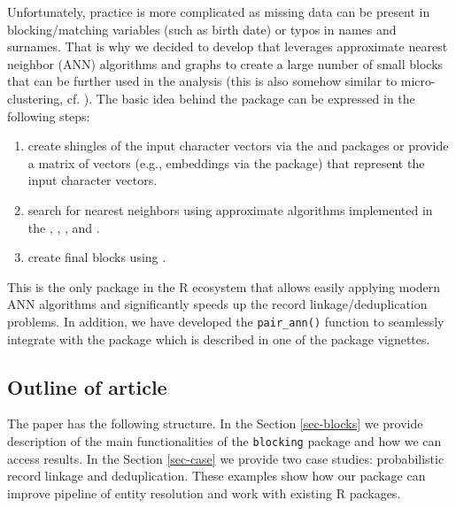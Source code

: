 Unfortunately, practice is more complicated as missing data can be
present in blocking/matching variables (such as birth date) or typos in
names and surnames. That is why we decided to develop 
that leverages approximate nearest neighbor (ANN) algorithms and graphs
to create a large number of small blocks that can be further used in the
analysis (this is also somehow similar to micro-clustering, cf.
\citet{johndrow2018theoretical}). The basic idea behind the 
package can be expressed in the following steps:

\begin{enumerate}
\def\labelenumi{\arabic{enumi}.}
\tightlist
\item
  create shingles of the input character vectors via the
   \citep{tokenizers} and 
  \citep{text2vec} packages or provide a matrix of vectors (e.g.,
  embeddings via the  \citep{ragnar} package) that
  represent the input character vectors.
\item
  search for nearest neighbors using approximate algorithms
  implemented in the  \citep{rnndescent},
   \citep{RcppHNSW},  \citep[
  \citet{mlpack2025}]{mlpack2023}, and  \citep{RcppAnnoy}.
\item
  create final blocks using  \citep[
  \citet{igraph2006}]{igraph2025}.
\end{enumerate}

This is the only package in the R ecosystem that allows easily applying
modern ANN algorithms and significantly speeds up the record
linkage/deduplication problems. In addition, we have developed the
\texttt{pair\_ann()} function to seamlessly integrate with the 
package which is described in one of the package vignettes.

\subsection{Outline of article}\label{outline-of-article}

The paper has the following structure. In the Section \ref{sec-blocks}
we provide description of the main functionalities of the \texttt{blocking}
package and how we can access results. In the Section \ref{sec-case} we
provide two case studies: probabilistic record linkage and
deduplication. These examples show how our package can improve pipeline
of entity resolution and work with existing R packages.

